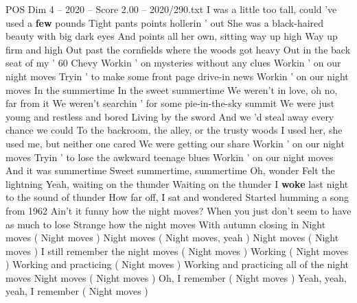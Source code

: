\begin{textsample}{POS Dim 4 – 2020 – Score 2.00 – 2020/290.txt}  \label{ex:f4_pos_025}
I was a little too tall, could 've used a \textbf{few} pounds Tight pants points hollerin ' out She was a black-haired beauty with big dark eyes And points all her own, sitting way up high Way up firm and high Out past the cornfields where the woods got heavy Out in the back seat of my ' 60 Chevy Workin ' on mysteries without any clues Workin ' on our night moves Tryin ' to make some front page drive-in news Workin ' on our night moves In the summertime In the sweet summertime We weren't in love, oh no, far from it We weren't searchin ' for some pie-in-the-sky summit We were just young and restless and bored Living by the sword And we 'd steal away every chance we could To the backroom, the alley, or the trusty woods I used her, she used me, but neither one cared We were getting our share Workin ' on our night moves Tryin ' to lose the awkward teenage blues Workin ' on our night moves And it was summertime Sweet summertime, summertime Oh, wonder Felt the lightning Yeah, waiting on the thunder Waiting on the thunder I \textbf{woke} last night to the sound of thunder How far off, I sat and wondered Started humming a song from 1962 Ain't it funny how the night moves?
When you just don't seem to have as much to lose Strange how the night moves With autumn closing in Night moves ( Night moves ) Night moves ( Night moves, yeah ) Night moves ( Night moves ) I still remember the night moves ( Night moves ) Working ( Night moves ) Working and practicing ( Night moves ) Working and practicing all of the night moves Night moves ( Night moves ) Oh, I remember ( Night moves ) Yeah, yeah, yeah, I remember ( Night moves )

\end{textsample}
